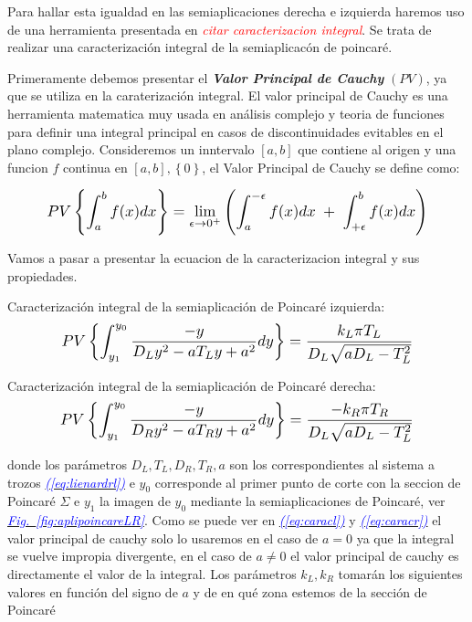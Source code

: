 \documentclass[12pt,a4paper]{report} %
\newcommand{\fref}[1]{\hyperref[#1]{\textcolor{blue}{\textit{Fig.~\ref*{#1}}}}}
\newcommand{\eref}[1]{\hyperref[#1]{\textcolor{blue}{\textit{(\ref*{#1})}}}}
\begin{document}
	Para hallar esta igualdad en las semiaplicaciones derecha e izquierda haremos uso de una herramienta presentada en \textit{\textcolor{red}{citar caracterizacion integral}}. Se trata de realizar una caracterización integral de la semiaplicacón de poincaré. 
		
	\vspace{0.5cm} Primeramente debemos presentar el \textit{\textbf{Valor Principal de Cauchy}} $\left(PV\right)$, ya que se utiliza en la caraterización integral. El valor principal de Cauchy es una herramienta matematica muy usada en análisis complejo y teoria de funciones para definir una integral principal en casos de discontinuidades evitables en el plano complejo. Consideremos un inntervalo $[a,b]$ que contiene al origen y una funcion $f$ continua en $[a,b],\left\{0\right\}$, el Valor Principal de Cauchy se define como:

	\begin{equation}
		\scalebox{1.2}{$\displaystyle
		 PV\left\{\int_{a}^{b}f(x)dx\right\}= \lim_{\epsilon \to 0^+}\left(
		\int_{a}^{-\epsilon}f(x)dx \; + \; 
		\int_{+\epsilon}^{b}f(x)dx
		\right)
		$}
	\end{equation}\smallskip
	\newpage
	
	\vspace{0.5cm} Vamos a pasar a presentar la ecuacion de la caracterizacion integral y sus propiedades.
	
	\vspace{0.5cm}\noindent Caracterización integral de la semiaplicación de Poincaré izquierda:
	\begin{equation}
		\label{eq:caracl}
		\scalebox{1.2}{$\displaystyle
		PV\left\{\int_{y_1}^{y_0}\frac{-y}{D_Ly^2-aT_Ly+a^2}dy\right\}=\frac{k_L\pi T_L}{D_L\sqrt{aD_L-T_L^2}}
		$}
	\end{equation}\smallskip
	
	\vspace{0.5cm}\noindent Caracterización integral de la semiaplicación de Poincaré derecha:
	\begin{equation}
		\label{eq:caracr}
		\scalebox{1.2}{$\displaystyle
			PV\left\{\int_{y_1}^{y_0}\frac{-y}{D_Ry^2-aT_Ry+a^2}dy\right\}=\frac{-k_R\pi T_R}{D_L\sqrt{aD_L-T_L^2}}
			$}
	\end{equation}\smallskip
	
	\noindent donde los parámetros $D_L,T_L,D_R,T_R,a$ son los correspondientes al sistema a trozos \eref{eq:lienardrl} e $y_0$ corresponde al primer punto de corte con la seccion de Poincaré $\varSigma$ e $y_1$ la imagen de $y_0$ mediante la semiaplicaciones de Poincaré, ver \fref{fig:aplipoincareLR}. Como se puede ver en \eref{eq:caracl} y \eref{eq:caracr} el valor principal de cauchy solo lo usaremos en el caso de $a=0$ ya que la integral se vuelve impropia divergente, en el caso de $a\neq0$ el valor principal de cauchy es directamente el valor de la integral. Los parámetros $k_L,k_R$ tomarán los siguientes valores en función del signo de $a$ y de en qué zona estemos de la sección de Poincaré
	
\end{document}

